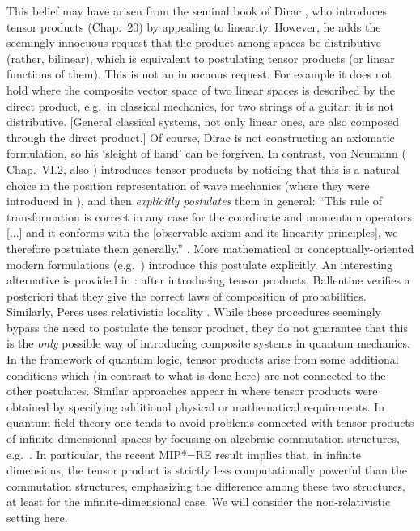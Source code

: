 \documentclass[aps,prl,amsmath,amssymb,twocolumn,nofootinbib]{revtex4}
\theoremstyle{plain}
\theoremstyle{definition}
\theoremstyle{remark}
\begin{document}
	This belief may have arisen from the seminal book of Dirac
	\cite{diracbook}, who introduces tensor products (Chap.~20) by
	appealing to linearity. However, he adds the seemingly innocuous
	request that the product among spaces be distributive (rather,
	bilinear), which is equivalent to postulating tensor products (or
	linear functions of them). This is not an innocuous request. For
	example it does not hold where the composite vector space of two
	linear spaces is described by the direct product, e.g.~in classical
	mechanics, for two strings of a guitar: it is not distributive.
	[General classical systems, not only linear ones, are also composed
	through the direct product.] Of course, Dirac is not constructing an
	axiomatic formulation, so his `sleight of hand' can be forgiven. In
	contrast, von Neumann (\cite{vonneumannbook} Chap.~VI.2, also
	\cite{jauch}) introduces tensor products by noticing that this is a
	natural choice in the position representation of wave mechanics (where
	they were introduced in \cite{weyl,epr}), and then {\em explicitly
		postulates} them in general: ``This rule of transformation is
	correct in any case for the coordinate and momentum operators [...]
	and it conforms with the [observable axiom and its linearity
	principles], we therefore postulate them generally.''
	\cite{vonneumannbook}.  More mathematical or conceptually-oriented
	modern formulations (e.g.~\cite{ozawa,masanes,wootters,nielsenchuang})
	introduce this postulate explicitly.  An interesting alternative is
	provided in \cite{ballentinebook,ballentinepaper}: after introducing
	tensor products, Ballentine verifies a posteriori that they give the
	correct laws of composition of probabilities. Similarly, Peres uses
	relativistic locality \cite{peres}. While these procedures seemingly
	bypass the need to postulate the tensor product, they do not guarantee
	that this is the {\em only} possible way of introducing composite
	systems in quantum mechanics. In the framework of quantum logic,
	tensor products arise from some additional conditions \cite{matolcsi}
	which (in contrast to what is done here) are not connected to the
	other postulates. Similar approaches appear in \cite{marmo,aerts}
	where tensor products were obtained by specifying additional physical
	or mathematical requirements. In quantum field theory one tends to
	avoid problems connected with tensor products of infinite dimensional
	spaces by focusing on algebraic commutation structures,
	e.g.~\cite{giddins,roos}.  In particular, the recent MIP*=RE result
	\cite{mipre} implies that, in infinite dimensions, the tensor product
	is strictly less computationally powerful than the commutation
	structures, emphasizing the difference among these two structures, at
	least for the infinite-dimensional case. We will consider the
	non-relativistic setting here.
	
\end{document}
